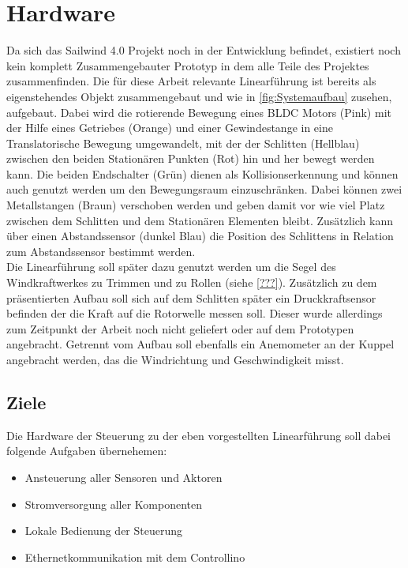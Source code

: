 \section{Hardware}
Da sich das Sailwind 4.0 Projekt noch in der Entwicklung befindet, existiert noch kein komplett Zusammengebauter Prototyp in dem alle Teile des Projektes zusammenfinden. Die für diese Arbeit relevante Linearführung ist bereits als eigenstehendes Objekt zusammengebaut und wie in \autoref{fig:Systemaufbau} zusehen, aufgebaut. Dabei wird die rotierende Bewegung eines BLDC Motors (Pink) mit der Hilfe eines Getriebes (Orange) und einer Gewindestange in eine Translatorische Bewegung umgewandelt, mit der der Schlitten (Hellblau) zwischen den beiden Stationären Punkten (Rot) hin und her bewegt werden kann. Die beiden Endschalter (Grün) dienen als Kollisionserkennung und können auch genutzt werden um den Bewegungsraum einzuschränken. Dabei können zwei Metallstangen (Braun) verschoben werden und geben damit vor wie viel Platz zwischen dem Schlitten und dem Stationären Elementen bleibt. Zusätzlich kann über einen Abstandssensor (dunkel Blau) die Position des Schlittens in Relation zum Abstandssensor bestimmt werden.\\

\noindent Die Linearführung soll später dazu genutzt werden um die Segel des Windkraftwerkes zu Trimmen und zu Rollen (siehe \autoref{???}). Zusätzlich zu dem präsentierten Aufbau soll sich auf dem Schlitten später ein Druckkraftsensor befinden der die Kraft auf die Rotorwelle messen soll. Dieser wurde allerdings zum Zeitpunkt der Arbeit noch nicht geliefert oder auf dem Prototypen angebracht. Getrennt vom Aufbau soll ebenfalls ein Anemometer an der Kuppel angebracht werden, das die Windrichtung und Geschwindigkeit misst.

\subsection{Ziele}
Die Hardware der Steuerung zu der eben vorgestellten Linearführung soll dabei folgende Aufgaben übernehemen:
\begin{itemize}
	\item Ansteuerung aller Sensoren und Aktoren
	\item Stromversorgung aller Komponenten
	\item Lokale Bedienung der Steuerung
	\item Ethernetkommunikation mit dem Controllino
\end{itemize}


